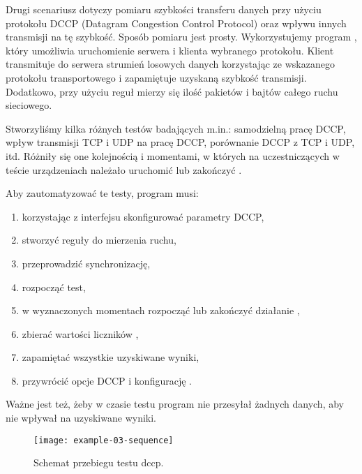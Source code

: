 \documentclass[00-praca-magisterska.tex]{subfiles}
\begin{document}

Drugi scenariusz dotyczy pomiaru szybkości transferu danych przy użyciu
protokołu DCCP (Datagram Congestion Control Protocol) oraz wpływu innych
transmisji na tę szybkość. Sposób pomiaru jest prosty. Wykorzystujemy program
, który umożliwia uruchomienie serwera i klienta wybranego
protokołu. Klient transmituje do serwera strumień losowych danych korzystając
ze wskazanego protokołu transportowego i zapamiętuje uzyskaną szybkość
transmisji. Dodatkowo, przy użyciu reguł  mierzy się ilość
pakietów i bajtów całego ruchu sieciowego.

Stworzyliśmy kilka różnych testów badających m.in.: samodzielną pracę DCCP,
wpływ transmisji TCP i UDP na pracę DCCP, porównanie DCCP z TCP i UDP, itd.
Różniły się one kolejnością i momentami, w których na uczestniczących w teście
urządzeniach należało uruchomić lub zakończyć .

Aby zautomatyzować te testy, program musi:
\begin{enumerate}
\item korzystając z interfejsu  skonfigurować parametry DCCP,
\item stworzyć reguły  do mierzenia ruchu,
\item przeprowadzić synchronizację, 
\item rozpocząć test,
\item w wyznaczonych momentach rozpocząć lub zakończyć działanie ,
\item zbierać wartości liczników ,
\item zapamiętać wszystkie uzyskiwane wyniki,
\item przywrócić opcje DCCP i konfigurację .
\end{enumerate}

Ważne jest też, żeby w czasie testu program nie przesyłał żadnych danych, aby
nie wpływał na uzyskiwane wyniki.

\begin{figure}[htb]
\begin{center}
\leavevmode
\texttt{[image: example-03-sequence]}
\end{center}
\caption{Schemat przebiegu testu dccp.}
\label{fig:example-03-sequence}
\end{figure}
\end{document}

